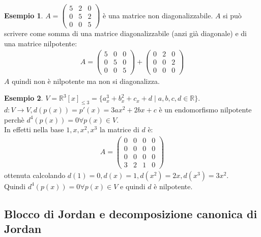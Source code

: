 \documentclass[a4paper]{article}
\theoremstyle{definition}
\newtheorem*{es}{Esempio}
\begin{document}
	\begin{es}
		$A = \begin{pmatrix}
			5 & 2 & 0 \\
			0 & 5 & 2 \\
			0 & 0 & 5
		\end{pmatrix}$ è una matrice non diagonalizzabile.
		$A$ si può scrivere come somma di una matrice diagonalizzabile (anzi già diagonale) e di una matrice nilpotente:
		\begin{align*}
			A = \begin{pmatrix}
				5 & 0 & 0 \\
				0 & 5 & 0 \\
				0 & 0 & 5
			\end{pmatrix} + \begin{pmatrix}
				0 & 2 & 0 \\
				0 & 0 & 2 \\
				0 & 0 & 0
			\end{pmatrix}
		\end{align*}
		$A$ quindi non è nilpotente ma non si diagonalizza.
	\end{es}

	\begin{es}
		$V = \mathbb{R}^3[x]_{\le 3} = \{a_x^3 + b_x^2 + c_x + d \mid a, b, c, d \in \mathbb{R}\}$. \\
		$d: V \to V, d(p(x)) = p'(x) = 3ax^2 + 2bx + c$ è un endomorfismo nilpotente perchè $d^4(p(x)) = 0 \forall p(x) \in V$. \\
		In effetti nella base $1, x, x^2, x^3$ la matrice di $d$ è:
		\begin{align*}
			A = \begin{pmatrix}
				0 & 0 & 0 & 0 \\
				0 & 0 & 0 & 0 \\
				0 & 0 & 0 & 0 \\
				3 & 2 & 1 & 0
			\end{pmatrix}
		\end{align*}
		ottenuta calcolando $d(1) = 0, d(x) = 1, d(x^2) = 2x, d(x^3) = 3x^2$. \\
		Quindi $d^4(p(x)) = 0 \forall p(x) \in V$ e quindi $d$ è nilpotente. \\
	\end{es}

	\subsection{Blocco di Jordan e decomposizione canonica di Jordan}
\end{document}
